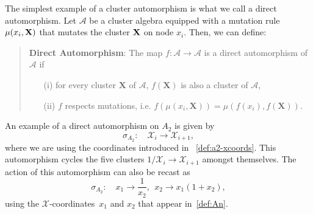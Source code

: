 \documentclass[11pt]{article}
\def\x{\mathcal{X}}
\def\xcoords{$\mathcal{X}$-coordinates}
\def\a{\mathcal{A}}
\begin{document}
The simplest example of a cluster automorphism is what we call a direct automorphism. Let $\a$ be a cluster algebra equipped with a mutation rule $\mu(x_i, \bf{X})$ that mutates the cluster $\bf{X}$ on node $x_i$. Then, we can define:
\begin{quote}
{\bf Direct Automorphism}: The map $f: \a \to \a$ is a direct automorphism of $\a$ if 
\vspace{-.2cm}
 \begin{itemize}
 \item[(i)] for every cluster $\mathbf{X}$ of $\a$, $f(\mathbf{X})$ is also a cluster of $\a$, 
 \item[(ii)] $f$ respects mutations, i.e. $f(\mu(x_i,\mathbf{X})) = \mu(f(x_i),f(\mathbf{X}))$.
 \end{itemize}
\end{quote}
An example of a direct automorphism on $A_2$ is given by
\begin{equation}
  \sigma_{A_2}:\quad \mathcal{X}_i \to \mathcal{X}_{i+1},
\end{equation}
where we are using the coordinates introduced in ~\eqref{def:a2-xcoords}. This automorphism cycles the five clusters $1/\x_i\to \x_{i+1}$ amongst themselves. The action of this automorphism can also be recast as
\begin{equation}
  \sigma_{A_2}:\quad x_1\to \frac{1}{x_2},~~ x_2\to x_1(1+x_2),
\end{equation}
using the \xcoords\ $x_1$ and $x_2$ that appear in~\eqref{def:An}. 
\end{document}

